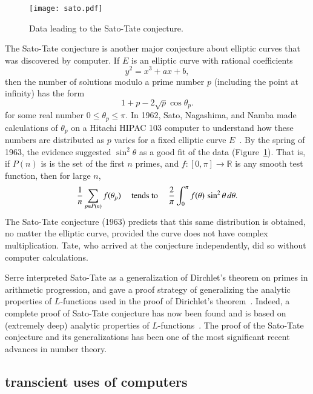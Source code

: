 \documentclass{llncs}
\newcommand{\ring}[1]{\mathbb{#1}}
\begin{document}

\begin{figure}[h!]
  \centering
\texttt{[image: sato.pdf]}
  \caption{Data leading to the Sato-Tate conjecture.}
\label{fig:st}
\end{figure}



The Sato-Tate conjecture is another major conjecture about elliptic
curves that was discovered by computer.  If $E$ is an elliptic curve
with rational coefficients
\[
y^2 = x^3 + a x + b,
\]
then the number of solutions modulo a prime number $p$ (including the
point at infinity) has the form
\[
1 + p - 2\sqrt{p}\cos\theta_p.
\]
for some real number $0\le \theta_p\le \pi$.  In 1962, Sato,
Nagashima, and Namba made calculations  of $\theta_p$ on a Hitachi
HIPAC 103 computer to understand how these numbers are distributed as
$p$ varies for a fixed elliptic curve $E$~\cite{Sch}.  By the spring of 1963, the
evidence suggested  $\sin^2\theta$ as a good fit of the data (Figure~\ref{fig:st}).
That is, if $P(n)$ is is the set of the first $n$ primes, and
$f:[0,\pi]\to\ring{R}$ is any smooth test function, then for large
$n$,
\[
\frac{1}{n}\sum_{p\in P(n)} f(\theta_p) \quad\hbox{ tends to }\quad
\frac{2}{\pi}\int_0^\pi f(\theta)\,\sin^2\theta\,d\theta.
\]
The Sato-Tate conjecture (1963) predicts that this same distribution is
obtained, no matter the elliptic curve, provided the curve does not
have complex multiplication.  Tate, who arrived at the conjecture
independently, did so without computer calculations.

Serre interpreted Sato-Tate as a generalization of Dirchlet's
theorem on primes in arithmetic progression, and gave a proof strategy
of generalizing the analytic properties of $L$-functions used in
the proof of Dirichlet's theorem~\cite{Se68}.  Indeed, a complete proof of Sato-Tate
conjecture has now been found and is based on (extremely deep)
analytic properties of $L$-functions~\cite{Car:Bourbaki}.
The proof of the Sato-Tate conjecture and its generalizations has been
one of the most significant recent advances in number theory.







\subsection{transcient uses of computers}
\end{document}
